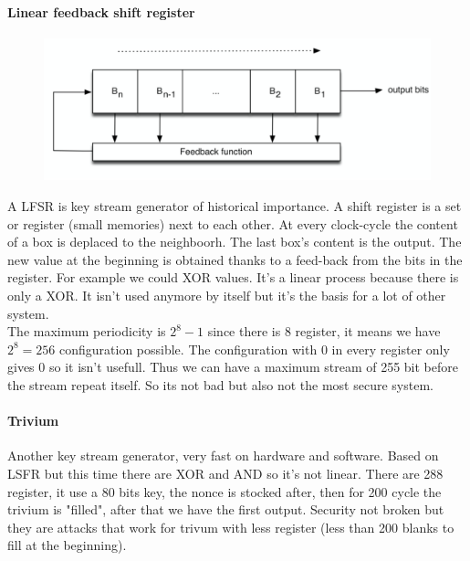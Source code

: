 \documentclass[11pt,a4paper]{report}
\begin{document}
\paragraph{Linear feedback shift register}
\begin{figure}
\vspace{-9mm}
\includegraphics[scale=0.5]{img/img1.png}
\end{figure}
A LFSR is key stream generator of historical importance. A shift register is a set or register (small memories) next to each other. At every clock-cycle the content of a box is deplaced to the neighboorh. The last box's content is the output. The new value at the beginning is obtained thanks to a feed-back from the bits in the register. For example we could XOR values. It's a linear process because there is only a XOR. It isn't used anymore by itself but it's the basis for a lot of other system.\\
The maximum periodicity is $2^8 - 1$ since there is 8 register, it means we have $2^8 = 256$ configuration possible. The configuration with 0 in every register only gives 0 so it isn't usefull. Thus we can have a maximum stream of 255 bit before the stream repeat itself. So its not bad but also not the most secure system.

\paragraph{Trivium}
Another key stream generator, very fast on hardware and software. Based on LSFR but this time there are XOR and AND so it's not linear. There are 288 register, it use a 80 bits key, the nonce is stocked after, then for 200 cycle the  trivium is "filled", after that we have the first output. Security not broken but they are attacks that work for trivum with less register (less than 200 blanks to fill at the beginning).
\end{document}
